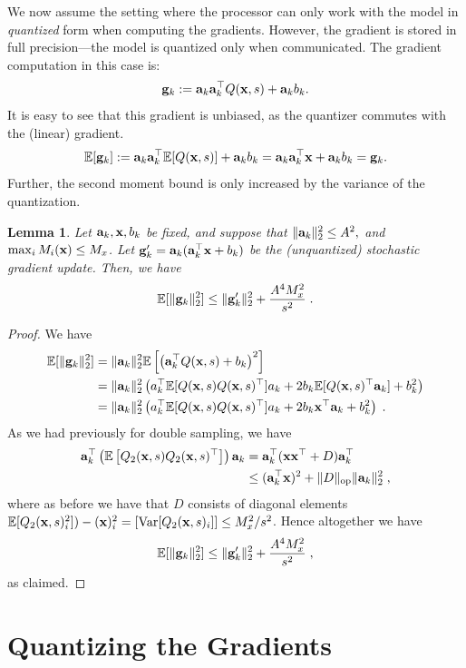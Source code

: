 \documentclass{article}
\def\a{{\bf a}}
\def\g{{\bf g}}
\def\x{{\bf x}}
\def\E{\mathbb{E}}
\newtheorem{lemma}{Lemma}
\begin{document}
We now assume the setting where the processor can only work with the model in \emph{quantized} form when computing the gradients. 
However, the gradient is stored in full precision---the model is quantized only when communicated. 
The gradient computation in this case is:
\begin{equation}
\label{eqn:leastsquares}
\g_k := \a_k \a_k^\top Q( \x , s) + \a_k b_k.
\end{equation}
It is easy to see that this gradient is unbiased, as the quantizer commutes with the (linear) gradient. 
\[
\E[ \g_k ]  := \a_k \a_k^\top \E [ Q( \x, s ) ]  + \a_k b_k = \a_k \a_k^\top \x   + \a_k b_k = \g_k .
\]
Further, the second moment bound is only increased by the variance of the quantization. 

\begin{lemma}
    \label{lem:model-quantization}
    Let $\a_k, \x, b_k$ be fixed, and suppose that $\| \a_k \|_2^2 \leq A^2,$ and $\max_i M_i (\x) \leq M_x$.
    Let $\g'_k = \a_k (\a_k^\top \x + b_k)$ be the (unquantized) stochastic gradient update.
    Then, we have
    \[
    \E [\| \g_k \|_2^2] \leq \| \g'_k \|_2^2 + \frac{A^4 M_x^2}{s^2} \; .
    \]
\end{lemma}
\begin{proof}
We have
\begin{align*}
    \E [\| \g_k \|_2^2] &= \| \a_k \|_2^2 \E \left[\left( \a_k^\top Q( \x, s)  + b_k \right)^2 \right] \\
    &= \| \a_k \|_2^2 \left( a_k^\top \E[Q(\x, s) Q(\x, s)^\top] a_k + 2 b_k \E[Q(\x, s)^\top \a_k] + b_k^2 \right) \\
    &= \| \a_k \|_2^2 \left( a_k^\top \E[Q(\x, s) Q(\x, s)^\top] a_k + 2 b_k \x^\top \a_k + b_k^2 \right) \; .
\end{align*}
As we had previously for double sampling, we have
\begin{align*}
    \a_k^\top \left( \E \left[ Q_2 (\x, s) Q_2 (\x, s)^\top \right] \right) \a_k &= \a_k^\top (\x \x^\top + D) \a_k^\top \\
    &\leq (\a_k^\top \x)^2 + \| D \|_{\mathrm{op}} \| \a_k \|_2^2 \; ,
\end{align*}
where as before we have that $D$ consists of diagonal elements $\E[Q_2 (\x, s)_i^2]) - (\x)_i^2 = [\mathrm{Var} [Q_2 (\x, s)_i]] \leq M_x^2 / s^2$.
Hence altogether we have
\[
\E [\| \g_k \|_2^2] \leq \| \g'_k \|_2^2 + \frac{A^4 M_x^2}{s^2} \; ,
\]
as claimed.
\end{proof}


\section{Quantizing the Gradients}
\end{document}
